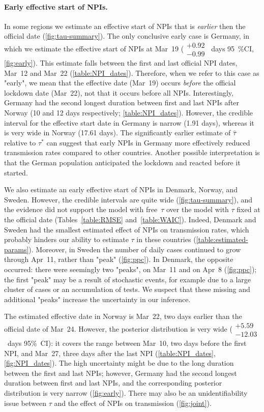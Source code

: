 \documentclass[12pt]{extarticle}
\begin{document}
\paragraph*{Early effective start of NPIs.}
In some regions we estimate an effective start of NPIs that is \emph{earlier} then the official date (\autoref{fig:tau-summary}).
The only conclusive early case is Germany, in which we estimate the effective start of NPIs at Mar~19 ($\substack{+0.92 \\ -0.99}$~days 95~\%CI, \autoref{fig:early}).
This estimate falls between the first and last official NPI dates, Mar~12 and Mar~22 (\autoref{table:NPI_dates}). Therefore, when we refer to this case as "early", we mean that the effective date (Mar~19) occurs \emph{before} the official lockdown date (Mar~22), not that it occurs before all NPIs.
Interestingly, Germany had the second longest duration between first and last NPIs after Norway (10 and 12 days respectively; \autoref{table:NPI_dates}).
However, the credible interval for the effective start date in Germany is narrow (1.91 days), whereas it is very wide in Norway (17.61 days).
The significantly earlier estimate of $\hat{\tau}$ relative to $\tau^*$ can suggest that early NPIs in Germany more effectively reduced transmission rates compared to other countries. Another possible interpretation is that the German population anticipated the lockdown and reacted before it started.

We also estimate an early effective start of NPIs in Denmark, Norway, and Sweden.
However, the credible intervals are quite wide (\autoref{fig:tau-summary}), and the evidence did not support the model with free~$\tau$ over the model with $\tau$ fixed at the official date (Tables~\ref{table:RMSE} and~\ref{table:WAIC}).
Indeed, Denmark and Sweden had the smallest estimated effect of NPIs on transmission rates, which  probably hinders our ability to estimate $\tau$ in these countries (\autoref{table:estimated-params}).
Moreover, in Sweden the number of daily cases continued to grow through Apr~11, rather than "peak" (\autoref{fig:ppc}). 
In Denmark, the opposite occurred: there were seemingly two "peaks", on Mar~11 and on Apr~8 (\autoref{fig:ppc}); the first "peak" may be a result of stochastic events, for example due to a large cluster of cases or an accumulation of tests.
We suspect that these missing and additional "peaks" increase the uncertainty in our inference.

The estimated effective date in Norway is Mar~22, two days earlier than the official date of Mar~24.
However, the posterior distribution is very wide ($\substack{+5.59 \\ -12.03}$~days 95\%~CI): it covers the range between Mar~10, two days before the first NPI, and Mar~27, three days after the last NPI (\autoref{table:NPI_dates}, \autoref{fig:NPI_dates}). 
The high uncertainty might be due to the long duration between the first and last NPIs; however, Germany had the second longest duration between first and last NPIs, and the corresponding posterior distribution is very narrow (\autoref{fig:early}).
There may also be an unidentifiability issue between $\tau$ and the effect of NPIs on transmission (\autoref{fig:joint}). 
\end{document}
